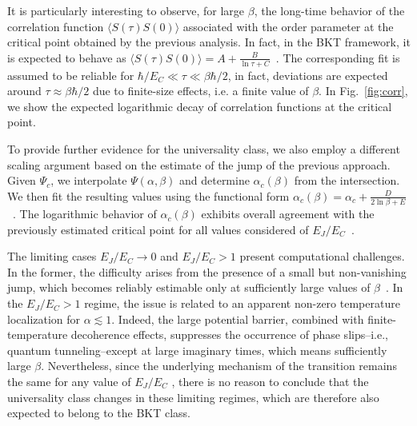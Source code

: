 \documentclass[aps,notitlepage,twocolumn,prl,nolongbibliography,superscriptaddress]{revtex4-2}
\newcommand{\thermal}[1]{\langle #1 \rangle}
\begin{document}
It is particularly interesting to observe, for large $\beta$, the long-time behavior of the correlation function $\thermal{S(\tau)S(0)}$ associated with the order parameter at the critical point obtained by the previous analysis. In fact, in the BKT framework, it is expected to behave as $\langle S(\tau)S(0)\rangle = A + \frac{B}{\ln \tau + C}$~\cite{Bhattacharjee_log_corr, Luijten_log_corr}. The corresponding fit is assumed to be reliable for $\hbar/E_C\ll\tau\ll\beta\hbar/2$, in fact, deviations are expected around $\tau \approx \beta \hbar/2$ due to finite-size effects, i.e. a finite value of $\beta$. In Fig.~\ref{fig:corr}, we show the expected logarithmic decay of correlation functions at the critical point.

To provide further evidence for the universality class, we also employ a different scaling argument based on the estimate of the jump of the previous approach. Given $\Psi_c$, we interpolate $\Psi(\alpha, \beta)$ and determine $\alpha_c(\beta)$ from the intersection. We then fit the resulting values using the functional form $\alpha_c(\beta) = \alpha_c + \frac{D}{2\ln\beta + E}$~\cite{Boninsegni}. The logarithmic behavior of $\alpha_c(\beta)$ exhibits overall agreement with the previously estimated critical point for all values considered of $E_J/E_C$~\cite{EndMatterRef}.

The limiting cases $E_J/E_C \to 0$ and $E_J/E_C > 1$ present computational challenges. In the former, the difficulty arises from the presence of a small but non-vanishing jump, which becomes reliably estimable only at sufficiently large values of $\beta$~\cite{EndMatterRef}. In the $E_J/E_C > 1$ regime, the issue is related to an apparent non-zero temperature localization for $\alpha \lesssim 1$. Indeed, the large potential barrier, combined with finite-temperature decoherence effects, suppresses the occurrence of phase slips--i.e., quantum tunneling--except at large imaginary times, which means sufficiently large $\beta$. Nevertheless, since the underlying mechanism of the transition remains the same for any value of $E_J/E_C$ \cite{PhysRevB_Paris, PhysRevLett_Giacomelli_Devoret}, there is no reason to conclude that the universality class changes in these limiting regimes, which are therefore also expected to belong to the BKT class.
\end{document}
